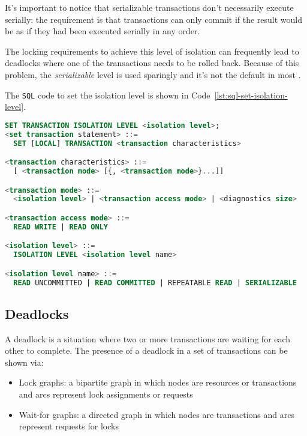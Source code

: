\documentclass[english]{article}
\begin{document}
\bigskip
It's important to notice that serializable transactions don't necessarily execute serially:
the requirement is that transactions can only commit if the result would be as if they had been executed serially in any order.

The locking requirements to achieve this level of isolation can frequently lead to deadlocks where one of the transactions needs to be rolled back.
Because of this problem, the \textit{serializable} level is used sparingly and it's not the default in most \dbms.

\bigskip
The \texttt{SQL} code to set the isolation level is shown in Code~\ref{lst:sql-set-isolation-level}.

\begin{lstlisting}[language=SQL, caption={\texttt{SQL} statement to set the isolation level of a transaction}, label={lst:sql-set-isolation-level}]
SET TRANSACTION ISOLATION LEVEL <isolation level>;
<set transaction statement> ::=
  SET [LOCAL] TRANSACTION <transaction characteristics>

<transaction characteristics> ::=
  [ <transaction mode> [{, <transaction mode>}...]]

<transaction mode> ::=
  <isolation level> | <transaction access mode> | <diagnostics size>

<transaction access mode> ::=
  READ WRITE | READ ONLY

<isolation level> ::=
  ISOLATION LEVEL <isolation level name>

<isolation level name> ::=
  READ UNCOMMITTED | READ COMMITTED | REPEATABLE READ | SERIALIZABLE
\end{lstlisting}

\subsection{Deadlocks}
\label{sec:deadlocks}

A deadlock is a situation where two or more transactions are waiting for each other to complete.
The presence of a deadlock in a set of transactions can be shown via:

\begin{itemize}
  \item Lock graphs: a bipartite graph in which nodes are resources or transactions and arcs represent lock assignments or requests
  \item Wait-for graphs: a directed graph in which nodes are transactions and arcs represent requests for locks
\end{itemize}
\end{document}
